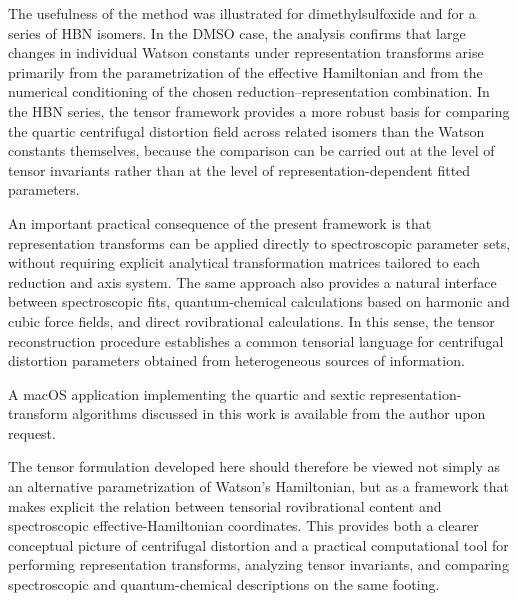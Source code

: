 The usefulness of the method was illustrated for dimethylsulfoxide and
for a series of HBN isomers.  In the DMSO case, the analysis confirms
that large changes in individual Watson constants under representation
transforms arise primarily from the parametrization of the effective
Hamiltonian and from the numerical conditioning of the chosen
reduction--representation combination.  In the HBN series, the tensor
framework provides a more robust basis for comparing the quartic
centrifugal distortion field across related isomers than the Watson
constants themselves, because the comparison can be carried out at the
level of tensor invariants rather than at the level of
representation-dependent fitted parameters.

An important practical consequence of the present framework is that
representation transforms can be applied directly to spectroscopic
parameter sets, without requiring explicit analytical transformation
matrices tailored to each reduction and axis system.  The same
approach also provides a natural interface between spectroscopic fits,
quantum-chemical calculations based on harmonic and cubic force
fields, and direct rovibrational calculations.  In this sense, the
tensor reconstruction procedure establishes a common tensorial language
for centrifugal distortion parameters obtained from heterogeneous
sources of information.

A macOS application implementing the quartic and sextic
representation-transform algorithms discussed in this work is
available from the author upon request.

The tensor formulation developed here should therefore be viewed not
simply as an alternative parametrization of Watson's Hamiltonian, but
as a framework that makes explicit the relation between tensorial
rovibrational content and spectroscopic effective-Hamiltonian
coordinates.  This provides both a clearer conceptual picture of
centrifugal distortion and a practical computational tool for
performing representation transforms, analyzing tensor invariants, and
comparing spectroscopic and quantum-chemical descriptions on the same
footing.
